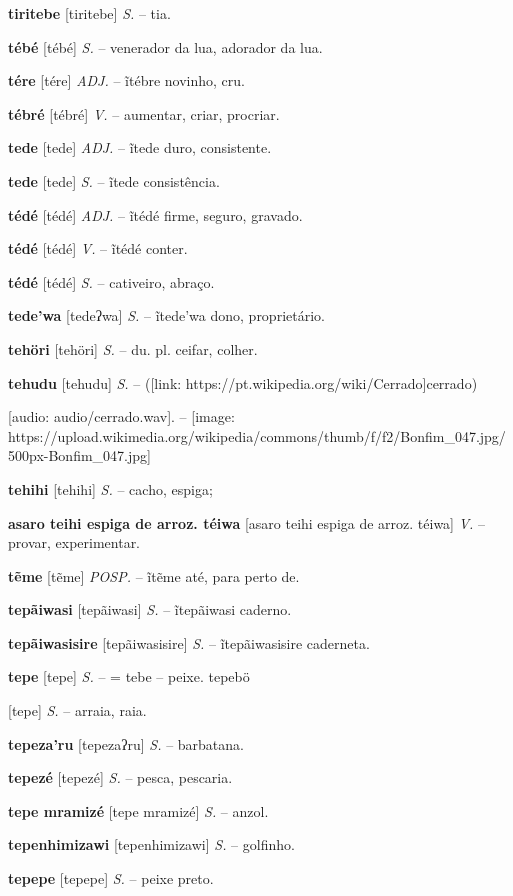 {{{{{\textbf{tiritebe} [tiritebe] \textit{S.} -- tia.

\textbf{tébé} [tébé] \textit{S.} -- venerador da lua, adorador da lua.

\textbf{tére} [tére] \textit{ADJ.} -- ĩtébre novinho, cru.

\textbf{tébré} [tébré] \textit{V.} -- aumentar, criar, procriar.

\textbf{tede} [tede] \textit{ADJ.} -- ĩtede duro, consistente.

\textbf{tede} [tede] \textit{S.} -- ĩtede consistência.

\textbf{tédé} [tédé] \textit{ADJ.} -- ĩtédé firme, seguro, gravado.

\textbf{tédé} [tédé] \textit{V.} -- ĩtédé conter.

\textbf{tédé} [tédé] \textit{S.} -- cativeiro, abraço.

\textbf{tede'wa} [tedeʔwa] \textit{S.} -- ĩtede'wa dono, proprietário.

\textbf{tehöri} [tehöri] \textit{S.} -- du. pl. ceifar, colher.

\textbf{tehudu} [tehudu] \textit{S.} -- ([link: https://pt.wikipedia.org/wiki/Cerrado]cerrado)} [audio: audio/cerrado.wav]{\faHeadphones}. -- [image: https://upload.wikimedia.org/wikipedia/commons/thumb/f/f2/Bonfim_047.jpg/500px-Bonfim_047.jpg]

\textbf{tehihi} [tehihi] \textit{S.} -- cacho, espiga;

\textbf{asaro teihi espiga de arroz. téiwa} [asaro teihi espiga de arroz. téiwa] \textit{V.} -- provar, experimentar.

\textbf{tẽme} [tẽme] \textit{POSP.} -- ĩtẽme até, para perto de.

\textbf{tepãiwasi} [tepãiwasi] \textit{S.} -- ĩtepãiwasi caderno.

\textbf{tepãiwasisire} [tepãiwasisire] \textit{S.} -- ĩtepãiwasisire caderneta.

\textbf{tepe} [tepe] \textit{S.} -- = tebe -- peixe. tepebö} [tepe] \textit{S.} -- arraia, raia.

\textbf{tepeza'ru} [tepezaʔru] \textit{S.} -- barbatana.

\textbf{tepezé} [tepezé] \textit{S.} -- pesca, pescaria.

\textbf{tepe mramizé} [tepe mramizé] \textit{S.} -- anzol.

\textbf{tepenhimizawi} [tepenhimizawi] \textit{S.} -- golfinho.

\textbf{tepepe} [tepepe] \textit{S.} -- peixe preto.

}}}
